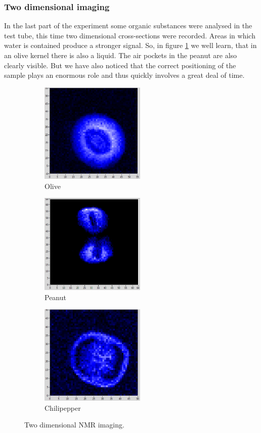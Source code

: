 \subsubsection{Two dimensional imaging}
In the last part of the experiment some organic substances were analysed in the test tube, this time two dimensional cross-sections were recorded.
Areas in which water is contained produce a stronger signal.
So, in figure \ref{fig:olive} we well learn, that in an olive kernel there is also a liquid.
The air pockets in the peanut are also clearly visible.
But we have also noticed that the correct positioning of the sample plays an enormous role and thus quickly involves a great deal of time.
\begin{figure}[ht]
\begin{subfigure}{.3\textwidth}
\includegraphics[width=5cm]{..//figures//olive.png}
\caption{Olive}
\label{fig:olive}
\end{subfigure}
\qquad
\begin{subfigure}{.3\textwidth}
\includegraphics[width=5cm]{..//figures//peanut.png}
\caption{Peanut}
\label{fig:peanut}
\end{subfigure}
\qquad
\begin{subfigure}{.3\textwidth}
\includegraphics[width=5cm]{..//figures//chilipepper.png}
\caption{Chilipepper}
\end{subfigure}
\caption{Two dimensional NMR imaging.}
\label{fig:2d}
\end{figure}